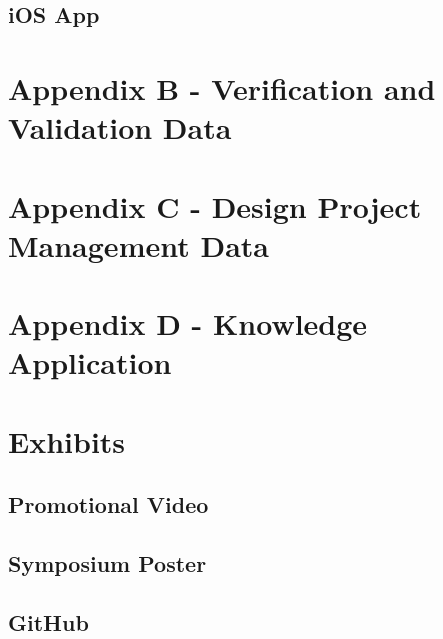 \documentclass[a4paper,11pt]{article}
\begin{document}
\subsection{iOS App}

\newpage
\section{Appendix B - Verification and Validation Data}

\section{Appendix C - Design Project Management Data}


\section{Appendix D - Knowledge Application}

\section{Exhibits}
\subsection{Promotional Video}
\subsection{Symposium Poster}
\subsection{GitHub}
\end{document}
